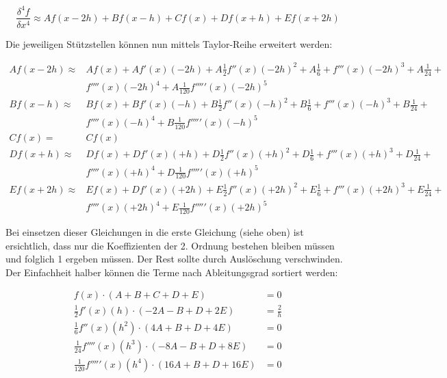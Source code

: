 \begin{equation}
\frac{\delta^{4} f}{\delta x^4} \approx Af(x-2h) + Bf(x-h) + Cf(x) + Df(x+h) + Ef(x+2h)
\end{equation}

Die jeweiligen Stützstellen können nun mittels Taylor-Reihe erweitert werden:

\begin{equation}
\begin{split}
Af(x-2h) \approx & Af(x) + Af'(x)(-2h) + A\frac{1}{2}f''(x)(-2h)^2+A\frac{1}{6} + f'''(x)(-2h)^3+A\frac{1}{24} + \\ 
& f''''(x)(-2h)^4 + A\frac{1}{120}f'''''(x)(-2h)^5 \\
Bf(x-h) \approx & Bf(x) + Bf'(x)(-h) + B\frac{1}{2}f''(x)(-h)^2+B\frac{1}{6} + f'''(x)(-h)^3+B\frac{1}{24} + \\ 
& f''''(x)(-h)^4 + B\frac{1}{120}f'''''(x)(-h)^5 \\
Cf(x) = & Cf(x) \\
Df(x+h) \approx & Df(x) + Df'(x)(+h) + D\frac{1}{2}f''(x)(+h)^2+D\frac{1}{6} + f'''(x)(+h)^3+D\frac{1}{24} + \\ 
& f''''(x)(+h)^4 + D\frac{1}{120}f'''''(x)(+h)^5 \\
Ef(x+2h) \approx & Ef(x) + Df'(x)(+2h) + E\frac{1}{2}f''(x)(+2h)^2+E\frac{1}{6} + f'''(x)(+2h)^3+E\frac{1}{24} + \\ 
& f''''(x)(+2h)^4 + E\frac{1}{120}f'''''(x)(+2h)^5
\end{split}
\end{equation}

Bei einsetzen dieser Gleichungen in die erste Gleichung (siehe oben) ist ersichtlich, dass nur die Koeffizienten der 2. Ordnung bestehen bleiben müssen und folglich 1 ergeben müssen. Der Rest sollte durch Auslöschung verschwinden. Der Einfachheit halber können die Terme nach Ableitungsgrad sortiert werden:

\begin{equation}
\begin{split}
f(x) \cdot (A + B + C + D + E) & = 0 \\
\frac{1}{2} f'(x)(h) \cdot (-2A - B + D + 2E) &= \frac{2}{h}\\
\frac{1}{6} f''(x)(h^2) \cdot (4A + B + D + 4E) &= 0 \\
\frac{1}{24} f''''(x)(h^3) \cdot (-8A - B + D + 8E) &= 0 \\
\frac{1}{120} f'''''(x)(h^4) \cdot (16A + B + D + 16E) &= 0 
\end{split}
\end{equation}

